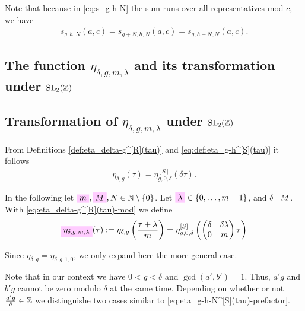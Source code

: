 \documentclass{article}
\begin{document}
Note that because in \eqref{eq:s_g-h-N} the sum runs over all
representatives mod $c$, we have
\begin{gather*}
  s_{g,h,N}(a,c)=s_{g+N,h,N}(a,c)=s_{g,h+N,N}(a,c).
\end{gather*}



\subsection{The function $\eta_{\delta,g,m,\lambda}$ and its
  transformation under $\SL2Z$}
\label{sec:[eta-delta-g-m-lambda-gamma-tau-Robins}

\subsection{Transformation of $\eta_{\delta,g,m,\lambda}$ under $\SL2Z$}
  \label{sec:transformation-eta_delta-g-m-lambda}

From Definitions \ref{def:eta_delta-g^[R](tau)} and
\ref{eq:def:eta_g-h^[S](tau)} it follows
\begin{align}
  \eta_{\delta,g}(\tau) = \eta_{g,0,\delta}^{[S]}(\delta \tau).
  \label{eq:eta_delta-g^[R](tau)-Schoeneberg}
\end{align}

In the following let
$\defineNotation[m]{m},
\defineNotation[M]{M},
N \in \setN \setminus \Set{0}$.
%
Let $\defineNotation[lambda]{\lambda} \in \Set{0,\ldots,m-1}$, and
$\delta \mid M$.
%
With \eqref{eq:eta_delta-g^[R](tau)-mod} we define
\begin{gather}
  \defineNotation[eta-delta-g-m-lambda-tau]{\eta_{\delta,g,m,\lambda}}(\tau)
  := \eta_{\delta,g}\left(\frac{\tau+\lambda}{m}\right)
  = \eta_{g,0,\delta}^{[S]}
  \left(
    \begin{pmatrix}\delta& \delta \lambda\\0&m\end{pmatrix} \tau
  \right)
\label{eq:eta_delta-g-m-lambda(tau)}
\end{gather}

Since $\eta_{\delta,g}=\eta_{\delta,g,1,0}$, we only expand here the
more general case.

Note that in our context we have $0 < g < \delta$ and
$\gcd(a', b')=1$. Thus, $a'g$ and $b'g$ cannot be zero modulo $\delta$
at the same time.
Depending on whether or not $\frac{a' g}{\delta}\in\mathbb{Z}$ we
distinguishe two cases similar to \eqref{eq:eta_g-h-N^[S](tau)-prefactor}.
\end{document}
